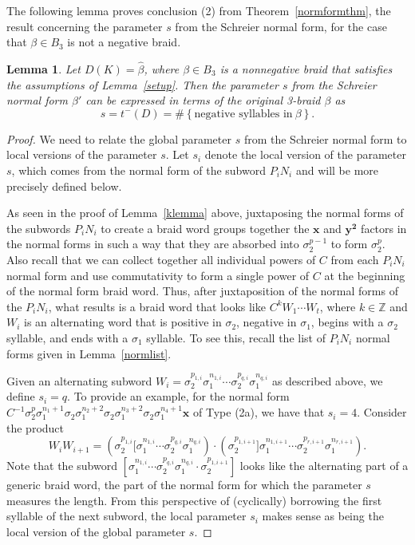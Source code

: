 \documentclass{article}
\newtheorem{lemma}{Lemma}[section]
\begin{document}
The following lemma proves conclusion (2) from Theorem~\ref{normformthm}, the result concerning the parameter $s$ from the Schreier normal form, for the case that $\beta \in B_{3}$ is not a negative braid. 

\begin{lemma} Let $D(K)=\widehat{\beta}$, where $\beta \in B_{3}$ is a nonnegative braid that satisfies the assumptions of Lemma~\ref{setup}. Then the parameter $s$ from the Schreier normal form $\beta'$ can be expressed in terms of the original 3-braid $\beta$ as 
$$s=t^{-}(D)=\#\left\{\text{negative\ syllables\ in}\ \beta \right\}.$$
\end{lemma}

\begin{proof}
We need to relate the global parameter $s$ from the Schreier normal form to local versions of the parameter $s$. Let $s_{i}$ denote the local version of the parameter $s$, which comes from the normal form of the subword $P_{i}N_{i}$ and will be more precisely defined below.  

As seen in the proof of Lemma~\ref{klemma} above, juxtaposing the normal forms of the subwords $P_{i}N_{i}$ to create a braid word groups together the $\mathbf{x}$ and $\mathbf{y^{2}}$ factors in the normal forms in such a way that they are absorbed into $\sigma_{2}^{p-1}$ to form $\sigma_{2}^{p}$. Also recall that we can collect together all individual powers of $C$ from each $P_{i}N_{i}$ normal form and use commutativity to form a single power of $C$ at the beginning of the normal form braid word. Thus, after juxtaposition of the normal forms of the $P_{i}N_{i}$, what results is a braid word that looks like $C^{k}W_{1} \cdots W_{t}$, where $k \in \mathbb{Z}$ and $W_{i}$ is an alternating word that is positive in $\sigma_{2}$, negative in $\sigma_{1}$, begins with a $\sigma_{2}$ syllable, and ends with a $\sigma_{1}$ syllable. To see this, recall the list of $P_{i}N_{i}$ normal forms given in Lemma~\ref{normlist}. 

Given an alternating subword $W_{i}=\sigma_{2}^{p_{1,i}}\sigma_{1}^{n_{1,i}}\cdots\sigma_{2}^{p_{q,i}}\sigma_{1}^{n_{q,i}}$ as described above, we define $s_{i}=q$. To provide an example, for the normal form $C^{-1}\sigma_{2}^{p}\sigma_{1}^{n_{1}+1}\sigma_{2}\sigma_{1}^{n_{2}+2}\sigma_{2}\sigma_{1}^{n_{3}+2}\sigma_{2}\sigma_{1}^{n_{4}+1}\mathbf{x}$ of Type (2a), we have that $s_{i}=4$. Consider the product
$$W_{i}W_{i+1}=(\sigma_{2}^{p_{1,i}}[\sigma_{1}^{n_{1,i}}\cdots\sigma_{2}^{p_{q,i}}\sigma_{1}^{n_{q,i}})\cdot(\sigma_{2}^{p_{1,i+1}}]\sigma_{1}^{n_{1,i+1}}\cdots\sigma_{2}^{p_{r,i+1}}\sigma_{1}^{n_{r,i+1}}).$$ Note that the subword $[\sigma_{1}^{n_{1,i}}\cdots\sigma_{2}^{p_{q,i}}\sigma_{1}^{n_{q,i}}\cdot\sigma_{2}^{p_{1,i+1}}]$ looks like the alternating part of a generic braid word, the part of the normal form for which the parameter $s$ measures the length. From this perspective of (cyclically) borrowing the first syllable of the next subword, the local parameter $s_{i}$ makes sense as being the local version of the global parameter $s$. 


\end{proof}
\end{document}

